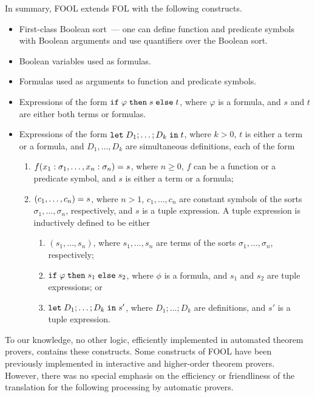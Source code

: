 In summary, FOOL extends FOL with the following constructs. 
\begin{itemize}
  \item First-class Boolean sort~--- one can define function and predicate symbols with Boolean arguments and use quantifiers over the Boolean sort.
  \item Boolean variables used as formulas.
  \item Formulas used as arguments to function and predicate symbols.
  \item Expressions of the form $\mathtt{if}\;{\varphi}\;\allowbreak\mathtt{then}\;{s}\;\allowbreak\mathtt{else}\;{t}$, where $\varphi$ is a formula, and $s$ and $t$ are either both terms or formulas.
  \item Expressions of the form $\mathtt{let}\;{D_1;\ldots;D_k}\;\allowbreak\mathtt{in}\;{t}$, where $k > 0$, $t$ is either a term or a formula, and $D_1,\ldots,D_k$ are simultaneous definitions, each of the form
    \begin{enumerate}
      \item ${f(x_1:\sigma_1,\ldots,x_n:\sigma_n)}={s}$, where $n \geq 0$, $f$ can be a function or a predicate symbol, and $s$ is either a term or a formula;
      \item ${(c_1,\ldots,c_n)}={s}$, where $n > 1$, $c_1,\ldots,c_n$ are constant symbols of the sorts $\sigma_1,\ldots,\sigma_n$, respectively, and $s$ is a tuple expression. A tuple expression is inductively defined to be either
      \begin{enumerate}
        \item $(s_1,\ldots,s_n)$, where $s_1,\ldots,s_n$ are terms of the sorts $\sigma_1,\ldots,\allowbreak\sigma_n$, respectively;
        \item $\mathtt{if}\;{\varphi}\;\allowbreak\mathtt{then}\;{s_1}\;\allowbreak\mathtt{else}\;{s_2}$, where $\phi$ is a formula, and $s_1$ and $s_2$ are tuple expressions; or
        \item $\mathtt{let}\;{D_1;\ldots;D_k}\;\allowbreak\mathtt{in}\;{s'}$, where $D_1;\ldots;D_k$ are definitions, and $s'$ is a tuple expression.
      \end{enumerate}
    \end{enumerate}
\end{itemize}

To our knowledge, no other logic, efficiently implemented in automated theorem provers, contains these constructs. Some constructs of FOOL have been previously implemented in interactive and higher-order theorem provers. However, there was no special emphasis on the efficiency or friendliness of the translation for the following processing by automatic provers.


